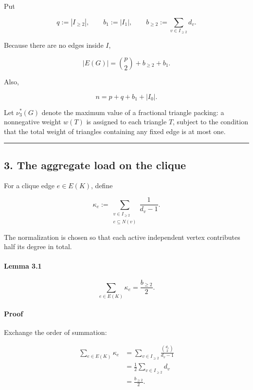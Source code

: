 \documentclass[english,11pt,a4paper]{article}
\begin{document}
Put

\[
q:=|I_{\ge2}|,
\qquad
b_1:=|I_1|,
\qquad
b_{\ge2}:=\sum_{v\in I_{\ge2}}d_v.
\]

Because there are no edges inside \(I\),

\[
|E(G)|
=
\binom{p}{2}+b_{\ge2}+b_1.
\tag{2.1}
\]

Also,

\[
n=p+q+b_1+|I_0|.
\tag{2.2}
\]

Let \(\nu_3^*(G)\) denote the maximum value of a fractional triangle
packing: a nonnegative weight \(w(T)\) is assigned to each triangle
\(T\), subject to the condition that the total weight of triangles
containing any fixed edge is at most one.

\begin{center}\rule{0.5\linewidth}{0.5pt}\end{center}

\subsection{3. The aggregate load on the
clique}\label{the-aggregate-load-on-the-clique}

For a clique edge \(e\in E(K)\), define

\[
\kappa_e
:=
\sum_{\substack{v\in I_{\ge2}\\ e\subseteq N(v)}}
\frac{1}{d_v-1}.
\tag{3.1}
\]

The normalization is chosen so that each active independent vertex
contributes half its degree in total.

\paragraph{Lemma 3.1}\label{lemma-3.1}

\[
\sum_{e\in E(K)}\kappa_e
=
\frac{b_{\ge2}}2.
\]

\paragraph{Proof}\label{proof}

Exchange the order of summation:

\[
\begin{aligned}
\sum_{e\in E(K)}\kappa_e
&=
\sum_{v\in I_{\ge2}}
\frac{\binom{d_v}{2}}{d_v-1}\\
&=
\frac12
\sum_{v\in I_{\ge2}}d_v\\
&=
\frac{b_{\ge2}}2.
\end{aligned}
\]
\end{document}
